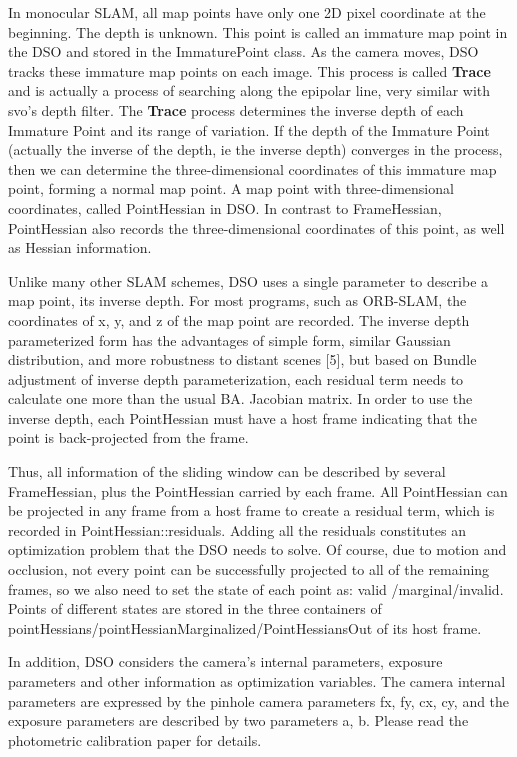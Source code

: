 \documentclass[a4paper,10pt]{article}
\begin{document}
	In monocular SLAM, all map points have only one 2D pixel coordinate at the beginning.  The depth is unknown. This point is called an immature map point in the DSO and stored in the ImmaturePoint class. As the camera moves, DSO tracks these immature map points on each image. This process is called \textbf{Trace} and is actually a process of searching along the epipolar line, very similar with svo's depth filter. The \textbf{Trace} process determines the inverse depth of each Immature Point and its range of variation. If the depth of the Immature Point (actually the inverse of the depth, ie the inverse depth) converges in the process, then we can determine the three-dimensional coordinates of this immature map point, forming a normal map point. A map point with three-dimensional coordinates, called PointHessian in DSO. In contrast to FrameHessian, PointHessian also records the three-dimensional coordinates of this point, as well as Hessian information.
	
	Unlike many other SLAM schemes, DSO uses a single parameter to describe a map point, its inverse depth. For most programs, such as ORB-SLAM, the coordinates of x, y, and z of the map point are recorded. The inverse depth parameterized form has the advantages of simple form, similar Gaussian distribution, and more robustness to distant scenes [5], but based on Bundle adjustment of inverse depth parameterization, each residual term needs to calculate one more than the usual BA. Jacobian matrix. In order to use the inverse depth, each PointHessian must have a host frame indicating that the point is back-projected from the frame.
	
	Thus, all information of the sliding window can be described by several FrameHessian, plus the PointHessian carried by each frame. All PointHessian can be projected in any frame from a host frame to create a residual term, which is recorded in PointHessian::residuals. Adding all the residuals constitutes an optimization problem that the DSO needs to solve. Of course, due to motion and occlusion, not every point can be successfully projected to all of the remaining frames, so we also need to set the state of each point as: valid /marginal/invalid. Points of different states are stored in the three containers of pointHessians/pointHessianMarginalized/PointHessiansOut of its host frame.
	
	In addition, DSO considers the camera's internal parameters, exposure parameters and other information as optimization variables. The camera internal parameters are expressed by the pinhole camera parameters fx, fy, cx, cy, and the exposure parameters are described by two parameters a, b. Please read the photometric calibration paper for details.
	
\end{document}
